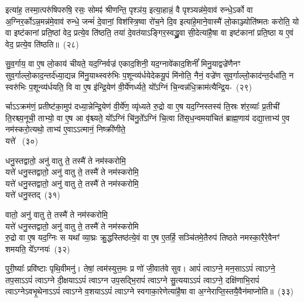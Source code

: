 इत्या॑ह॒ तस्मा॒त्परु॑षिपरुषि॒ रसः॒ सोमꣴ॑ श्रीणन्ति॒ पृश्ञ॑य॒ इत्या॒हान्नं॒ वै पृश्ञ्यन्न॑मे॒वाव॑ रुन्धे॒\-ऽर्को वा अ॒ग्निर॒र्को\-ऽन्न॒मन्न॑मे॒वाव॑ रुन्धे॒ जन्मं॑ दे॒वानां॒ विश॑स्त्रि॒ष्वा रो॑च॒ने दि॒व इत्या॑हे॒माने॒वास्मै॑ लो॒काञ्ज्योति॑ष्मतः करोति॒ यो वा इष्ट॑कानां प्रति॒ष्ठां वेद॒ प्रत्ये॒व ति॑ष्ठति॒ तया॑ दे॒वत॑या\-ऽ\-ङ्गिर॒स्वद्ध्रु॒वा सी॒देत्या॑है॒षा वा इष्ट॑कानां प्रति॒ष्ठा य ए॒वं वेद॒ प्रत्ये॒व ति॑ष्ठति॥~(२८)\ip

{\anuvakamend[{रू॒पाणि॒ सूद॑दोहस॒स्तया॒ षोड॑श च}]}

सु॒व॒र्गाय॒ वा ए॒ष लो॒काय॑ चीयते॒ यद॒ग्निर्वज्र॑ एकाद॒शिनी॒ यद॒ग्नावे॑काद॒शिनीं᳚ मिनु॒याद्वज्रे॑णैनꣳ सुव॒र्गाल्लो॒का\-द॒न्तर्द॑ध्या॒द्यन्न मि॑नु॒याथ्स्वरु॑भिः प॒शून्व्य॑र्धयेदेकयू॒पं मि॑नोति॒ नैनं॒ वज्रे॑ण सुव॒र्गाल्लो॒काद॑न्त॒र्दधा॑ति॒ न स्वरु॑भिः प॒शून्व्य॑र्धयति॒ वि वा ए॒ष इ॑न्द्रि॒येण॑ वी॒र्ये॑णर्ध्यते॒ यो᳚\-ऽग्निं चि॒न्वन्न॑धि॒क्राम॑त्यैन्द्रि॒य-~(२९)\ip

र्चा\-ऽऽक्रम॑णं॒ प्रतीष्ट॑का॒मुप॑ दध्या॒न्नेन्द्रि॒येण॑ वी॒र्ये॑ण॒ व्यृ॑ध्यते रु॒द्रो वा ए॒ष यद॒ग्निस्तस्य॑ ति॒स्रः श॑र॒व्याः᳚ प्र॒तीची॑ ति॒रश्च्य॒नूची॒ ताभ्यो॒ वा ए॒ष आ वृ॑श्च्यते॒ यो᳚\-ऽग्निं चि॑नु॒ते᳚\-ऽग्निं चि॒त्वा ति॑सृध॒न्वमया॑चितं ब्राह्म॒णाय॑ दद्या॒त्ताभ्य॑ ए॒व नम॑स्करो॒त्यथो॒ ताभ्य॑ ए॒वा\-ऽऽत्मानं॒ निष्क्री॑णीते॒\\यत्ते॑ ~(३०)\ip

धनु॒स्तद्वातो॒ अनु॑ वातु ते॒ तस्मै॑ ते  नम॑स्करोमि॒\\यत्ते॑  धनु॒स्तद्वातो॒ अनु॑ वातु ते॒ तस्मै॑ ते  नम॑स्करोमि॒\\यत्ते॑  धनु॒स्तद्वातो॒ अनु॑ वातु ते॒ तस्मै॑ ते  नम॑स्करोमि॒\\यत्ते॑  धनु॒स्तद्~(३१)\ip

वातो॒ अनु॑ वातु ते॒ तस्मै॑ ते  नम॑स्करोमि॒\\यत्ते॑  धनु॒स्तद्वातो॒ अनु॑ वातु ते॒ तस्मै॑ ते  नम॑स्करोमि\\रु॒द्रो वा ए॒ष यद॒ग्निः स यथा᳚ व्या॒घ्रः क्रु॒द्धस्तिष्ठ॑त्ये॒वं वा ए॒ष ए॒तर्\mbox{}हि॒ सञ्चि॑तमे॒तैरुप॑ तिष्ठते नमस्का॒रैरे॒वैनꣳ॑ शमयति॒ ये᳚\-ऽग्नयः॑~(३२)\ip

पुरी॒ष्याः᳚ प्रवि॑ष्टाः पृथि॒वीमनु॑। तेषां॒ त्वम॑स्युत्त॒मः प्र णो॑ जी॒वात॑वे सुव। आपं॑ त्वा\-ऽग्ने॒ मन॒सा\-ऽऽपं॑ त्वा\-ऽग्ने॒ तप॒सा\-ऽऽपं॑ त्वा\-ऽग्ने दी॒क्षया\-ऽऽपं॑ त्वा\-ऽग्न उप॒सद्भि॒रापं॑ त्वाऽग्ने सु॒त्यया\-ऽऽपं॑ त्वा\-ऽग्ने॒ दक्षि॑णाभि॒रापं॑ त्वाऽग्ने\-ऽवभृ॒थेना\-ऽऽपं॑ त्वाऽग्ने व॒शया\-ऽऽपं॑ त्वाऽग्ने स्वगाका॒रेणेत्या॑है॒षा वा अ॒ग्नेराप्ति॒स्तयै॒वैन॑माप्नोति॥~(३३)\ip

